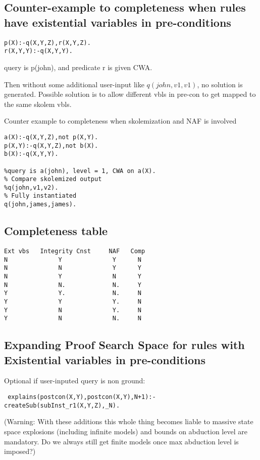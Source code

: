 \subsection{Counter-example to completeness when rules have existential variables in pre-conditions}
\begin{verbatim}
p(X):-q(X,Y,Z),r(X,Y,Z).
r(X,Y,Y):-q(X,Y,Y).
\end{verbatim}
query is p(john), and predicate r is given CWA. 

Then without some additional user-input like $q(john, v1,v1)$, no solution is generated. Possible solution is to allow different vbls in pre-con to get mapped to the same skolem vbls.

Counter example to completeness when skolemization and NAF is involved
\begin{verbatim}
a(X):-q(X,Y,Z),not p(X,Y).
p(X,Y):-q(X,Y,Z),not b(X).
b(X):-q(X,Y,Y).

%query is a(john), level = 1, CWA on a(X).
% Compare skolemized output
%q(john,v1,v2).
% Fully instantiated
q(john,james,james).    
\end{verbatim}

\subsection{Completeness table}
\begin{verbatim}
Ext vbs   Integrity Cnst     NAF   Comp
N              Y              Y      N
N              N              Y      Y
N              Y              N      Y
N              N.             N.     Y  
Y              Y.             N.     N 
Y              Y              Y.     N
Y              N              Y.     N 
Y              N              N.     N 
\end{verbatim}


\subsection{Expanding Proof Search Space for rules with Existential variables in pre-conditions}

Optional if user-inputed query is non ground:
\begin{verbatim}
 explains(postcon(X,Y),postcon(X,Y),N+1):-createSub(subInst_r1(X,Y,Z),_N).   
\end{verbatim}
(Warning: With these additions this whole thing becomes liable to massive state space explosions (including infinite models) and bounds on abduction level are mandatory. Do we always still get finite models once max abduction level is imposed?)


